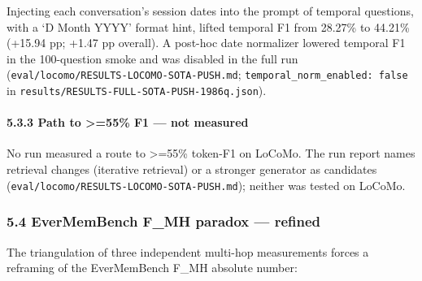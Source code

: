 \documentclass[
]{article}
\begin{document}
Injecting each conversation's session dates into the prompt of temporal
questions, with a `D Month YYYY' format hint, lifted temporal F1 from
28.27\% to 44.21\% (+15.94 pp; +1.47 pp overall). A post-hoc date
normalizer lowered temporal F1 in the 100-question smoke and was
disabled in the full run
(\texttt{eval/locomo/RESULTS-LOCOMO-SOTA-PUSH.md};
\texttt{temporal\_norm\_enabled:\ false} in
\texttt{results/RESULTS-FULL-SOTA-PUSH-1986q.json}).

\paragraph{5.3.3 Path to \textgreater=55\% F1 --- not
measured}\label{path-to-55-f1-not-measured}

No run measured a route to \textgreater=55\% token-F1 on LoCoMo. The run
report names retrieval changes (iterative retrieval) or a stronger
generator as candidates
(\texttt{eval/locomo/RESULTS-LOCOMO-SOTA-PUSH.md}); neither was tested
on LoCoMo.

\subsubsection{5.4 EverMemBench F\_MH paradox ---
refined}\label{evermembench-f_mh-paradox-refined}

The triangulation of three independent multi-hop measurements forces a
reframing of the EverMemBench F\_MH absolute number:
\end{document}
